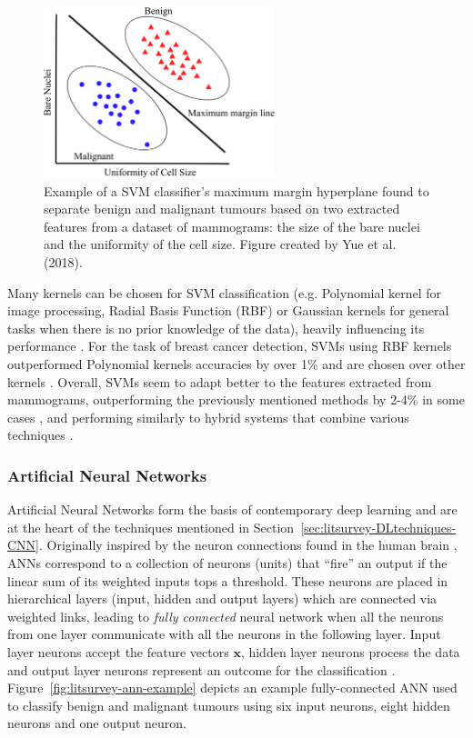 \begin{figure}[ht]
\centerline{\includegraphics[width=0.6\textwidth]{Dissertation/figures/litsurvey/svm.png}}
\caption{\label{fig:litsurvey-svm-example}Example of a SVM classifier's maximum margin hyperplane found to separate benign and malignant tumours based on two extracted features from a dataset of mammograms: the size of the bare nuclei and the uniformity of the cell size. Figure created by Yue et al. (2018).}
\end{figure}

Many kernels can be chosen for SVM classification (e.g. Polynomial kernel for image processing, Radial Basis Function (RBF) or Gaussian kernels for general tasks when there is no prior knowledge of the data), heavily influencing its performance \cite{amari1999improving}. For the task of breast cancer detection, SVMs using RBF kernels outperformed Polynomial kernels accuracies by over 1\% \cite{Osareh2010} and are chosen over other kernels \cite{Asri2016}. Overall, SVMs seem to  adapt better to the features extracted from mammograms, outperforming the previously mentioned methods by  2-4\% in some cases \cite{Asri2016}, and performing similarly to hybrid systems that combine various techniques \cite{Yue2018}.

\subsubsection{Artificial Neural Networks}

Artificial Neural Networks form the basis of contemporary deep learning and are at the heart of the techniques mentioned in Section~\ref{sec:litsurvey-DLtechniques-CNN}. Originally inspired by the neuron connections found in the human brain \cite{mcculloch1943logical}, ANNs correspond to a collection of neurons (units) that ``fire'' an output if the linear sum of its weighted inputs tops a threshold. These neurons are placed in hierarchical layers (input, hidden and output layers) which are connected via weighted links, leading to \textit{fully connected} neural network when all the neurons from one layer communicate with all the neurons in the following layer. Input layer neurons accept the feature vectors $\textbf{x}$, hidden layer neurons process the data and output layer neurons represent an outcome for the classification \cite{russell2002artificial}. Figure~\ref{fig:litsurvey-ann-example} depicts an example fully-connected ANN used to classify benign and malignant tumours using six input neurons, eight hidden neurons and one output neuron.\\

